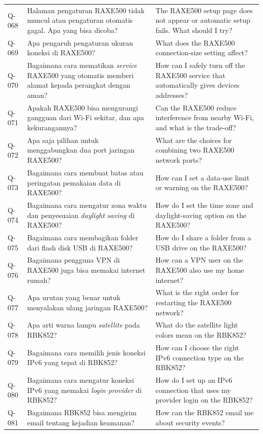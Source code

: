 \begin{longtable}{@{}>{\RaggedRight\arraybackslash}p{1.6cm}>{\RaggedRight\arraybackslash}p{5.8cm}>{\RaggedRight\arraybackslash}p{\dimexpr\textwidth-1.6cm-5.8cm-4\tabcolsep\relax}@{}}
Q-068 & Halaman pengaturan RAXE500 tidak muncul atau pengaturan otomatis gagal. Apa yang bisa dicoba? & The RAXE500 setup page does not appear or automatic setup fails. What should I try? \\
Q-069 & Apa pengaruh pengaturan ukuran koneksi di RAXE500? & What does the RAXE500 connection-size setting affect? \\
Q-070 & Bagaimana cara mematikan \emph{service} RAXE500 yang otomatis memberi alamat kepada perangkat dengan aman? & How can I safely turn off the RAXE500 service that automatically gives devices addresses? \\
Q-071 & Apakah RAXE500 bisa mengurangi gangguan dari Wi-Fi sekitar, dan apa kekurangannya? & Can the RAXE500 reduce interference from nearby Wi-Fi, and what is the trade-off? \\
Q-072 & Apa saja pilihan untuk menggabungkan dua port jaringan RAXE500? & What are the choices for combining two RAXE500 network ports? \\
Q-073 & Bagaimana cara membuat batas atau peringatan pemakaian data di RAXE500? & How can I set a data-use limit or warning on the RAXE500? \\
Q-074 & Bagaimana cara mengatur zona waktu dan penyesuaian \emph{daylight saving} di RAXE500? & How do I set the time zone and daylight-saving option on the RAXE500? \\
Q-075 & Bagaimana cara membagikan folder dari flash disk USB di RAXE500? & How do I share a folder from a USB drive on the RAXE500? \\
Q-076 & Bagaimana pengguna VPN di RAXE500 juga bisa memakai internet rumah? & How can a VPN user on the RAXE500 also use my home internet? \\
Q-077 & Apa urutan yang benar untuk menyalakan ulang jaringan RAXE500? & What is the right order for restarting the RAXE500 network? \\
Q-078 & Apa arti warna lampu \emph{satellite} pada RBK852? & What do the satellite light colors mean on the RBK852? \\
Q-079 & Bagaimana cara memilih jenis koneksi IPv6 yang tepat di RBK852? & How can I choose the right IPv6 connection type on the RBK852? \\
Q-080 & Bagaimana cara mengatur koneksi IPv6 yang memakai \emph{login provider} di RBK852? & How do I set up an IPv6 connection that uses my provider login on the RBK852? \\
Q-081 & Bagaimana RBK852 bisa mengirim email tentang kejadian keamanan? & How can the RBK852 email me about security events? \\

\end{longtable}
